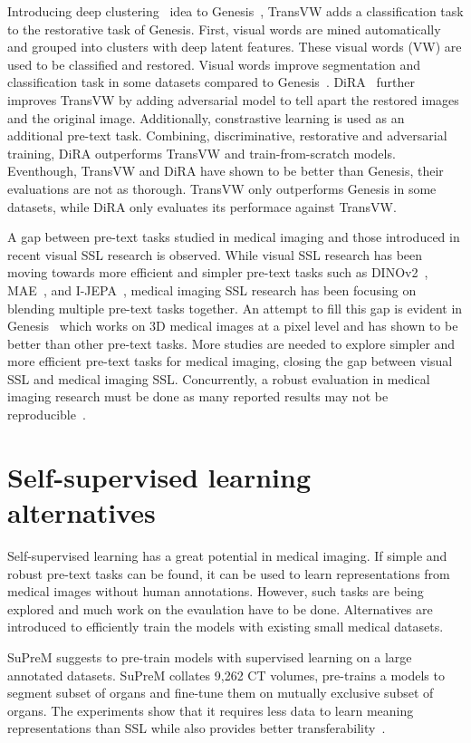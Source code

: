 \documentclass[a4paper,11pt,oneside]{report}
\begin{document}
Introducing deep clustering~\cite{Caron2018} idea to Genesis~\cite{Zhou2021}, TransVW adds a classification task to the restorative task of Genesis. First, visual words are mined automatically and grouped into clusters with deep latent features. These visual words (VW) are used to be classified and restored. Visual words improve segmentation and classification task in some datasets compared to Genesis~\cite{Haghighi2021}. DiRA~\cite{Haghighi2024} further improves TransVW by adding adversarial model to tell apart the restored images and the original image. Additionally, constrastive learning is used as an additional pre-text task. Combining, discriminative, restorative and adversarial training, DiRA outperforms TransVW and train-from-scratch models. Eventhough, TransVW and DiRA have shown to be better than Genesis, their evaluations are not as thorough. TransVW only outperforms Genesis in some datasets, while DiRA only evaluates its performace against TransVW.

A gap between pre-text tasks studied in medical imaging and those introduced in recent visual SSL research is observed. While visual SSL research has been moving towards more efficient and simpler pre-text tasks such as DINOv2~\cite{Oquab2024dinov}, MAE~\cite{He2022}, and I-JEPA~\cite{Assran2023}, medical imaging SSL research has been focusing on blending multiple pre-text tasks together. An attempt to fill this gap is evident in Genesis~\cite{Zhou2021} which works on 3D medical images at a pixel level and has shown to be better than other pre-text tasks. More studies are needed to explore simpler and more efficient pre-text tasks for medical imaging, closing the gap between visual SSL and medical imaging SSL. Concurrently, a robust evaluation in medical imaging research must be done as many reported results may not be reproducible~\cite{Isensee2024}.
\section{Self-supervised learning alternatives}
Self-supervised learning has a great potential in medical imaging. If simple and robust pre-text tasks can be found, it can be used to learn representations from medical images without human annotations. However, such tasks are being explored and much work on the evaulation have to be done. Alternatives are introduced to efficiently train the models with existing small medical datasets.

SuPreM suggests to pre-train models with supervised learning on a large annotated datasets. SuPreM collates 9,262 CT volumes, pre-trains a models to segment subset of organs and fine-tune them on mutually exclusive subset of organs. The experiments show that it requires less data to learn meaning representations than SSL while also provides better transferability~\cite{Li2024}.
\end{document}
